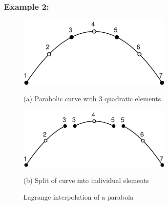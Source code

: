 \subsubsection{Example 2:}

\begin{figure}[t!]
\begin{center}

\includegraphics[width=3in]{figs/parab_3fe_L2}

\centerline{(a) Parabolic curve with 3 quadratic elements}

\includegraphics[width=3in]{figs/parab_3el_L2}

\centerline{(b) Split of  curve into individual elements}

\caption{Lagrange interpolation of a parabola \label{fig1l} }
\end{center}
\end{figure}

